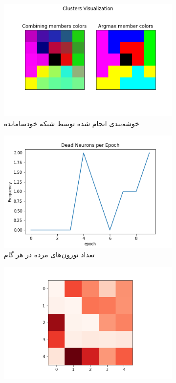 \documentclass[12pt, a4paper]{article}
\begin{document}
\clearpage

\begin{figure}[h]
    \begin{subfigure}{\linewidth}
        \centering
        \includegraphics[width=0.8\linewidth]{images/q5/r3/cluster.png}
        \caption{خوشه‌بندی انجام شده توسط شبکه خودسامانده}
    \end{subfigure}
    \newline
    \begin{subfigure}{0.45\linewidth}
        \includegraphics[width=\linewidth]{images/q5/r3/dead.png}
        \caption{تعداد نورون‌های مرده در هر گام}
    \end{subfigure}
    \hfill
    \begin{subfigure}{0.45\linewidth}
        \includegraphics[width=\linewidth]{images/q5/r3/umatrix.png}

\end{subfigure}
\end{figure}
\end{document}
